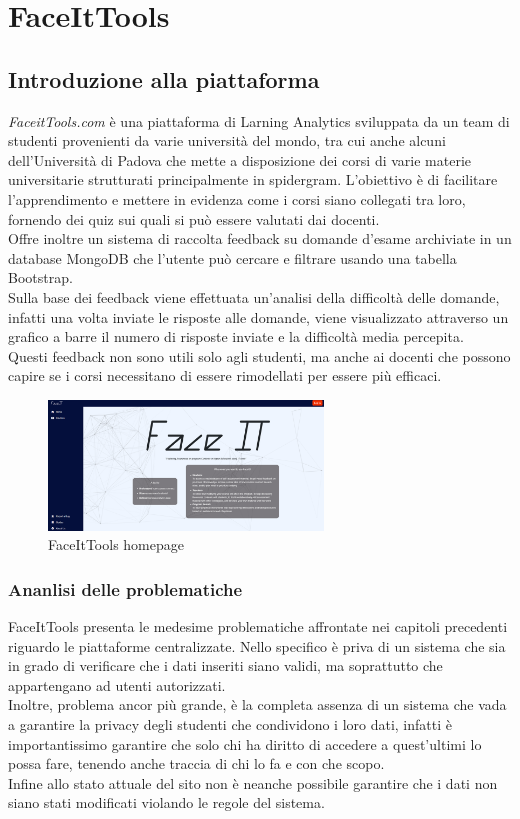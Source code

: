 \chapter{FaceItTools}
\section{Introduzione alla piattaforma}
\textit{FaceitTools.com} è una piattaforma di Larning Analytics sviluppata da un team di studenti provenienti da varie università del mondo, tra cui anche alcuni dell'Università di Padova che mette a disposizione dei corsi di varie materie universitarie strutturati principalmente in spidergram.
L'obiettivo è di facilitare l'apprendimento e mettere in evidenza come i corsi siano collegati tra loro, fornendo dei quiz sui quali si può essere valutati dai docenti.
\\Offre inoltre un sistema di raccolta feedback su domande d'esame archiviate in un database MongoDB che l’utente può cercare e filtrare usando una tabella Bootstrap.
\\Sulla base dei feedback viene effettuata un'analisi della difficoltà delle domande, infatti una volta inviate le risposte alle domande, viene visualizzato attraverso un grafico a barre il numero di risposte inviate e la difficoltà media percepita.
\\Questi feedback non sono utili solo agli studenti, ma anche ai docenti che possono capire se i corsi necessitano di essere rimodellati per essere più efficaci.
\begin{figure}[h]
    \centering
    \includegraphics[width=0.65\textwidth]{Immagini/FaceItTools.PNG}
    \caption{FaceItTools homepage}
\end{figure}
\subsection{Ananlisi delle problematiche}
FaceItTools presenta le medesime problematiche affrontate nei capitoli precedenti riguardo le piattaforme centralizzate.
Nello specifico è priva di un sistema che sia in grado di verificare che i dati inseriti siano validi, ma soprattutto che appartengano ad utenti autorizzati.
\\Inoltre, problema ancor più grande, è la completa assenza di un sistema che vada a garantire la privacy degli studenti che condividono i loro dati, 
infatti è importantissimo garantire che solo chi ha diritto di accedere a quest'ultimi lo possa fare, tenendo anche traccia di chi lo fa e con che scopo.
\\Infine allo stato attuale del sito non è neanche possibile garantire che i dati non siano stati modificati violando le regole del sistema.
